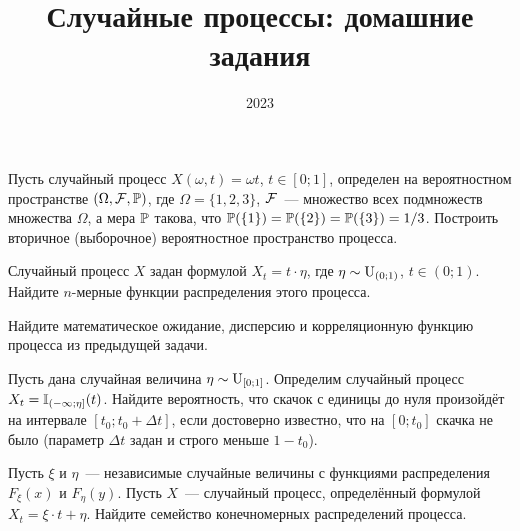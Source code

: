 \documentclass[12pt]{article}
\title{Случайные процессы: домашние задания}
\author{}
\date{2023}
\def\canon{\textbf{(каноническое задание)}}
\begin{document}

\maketitle

\newpage




\begin{exercise}[subtitle={\canon}]
    Пусть случайный процесс $ X(\omega, t) = \omega t $, $ t \in [0; 1] $,
    определен на вероятностном пространстве $ (\Omega, \mathcal{F}, \mathbb{P}) $,
    где $ \Omega = \{1, 2, 3\} $, $ \mathcal{F} $~--- множество всех подмножеств множества $ \Omega $,
    а мера $ \mathbb{P} $ такова, что $ \mathbb{P}(\{1\}) = \mathbb{P}(\{2\}) = \mathbb{P}(\{3\}) = 1/3 $.
    Построить вторичное (выборочное) вероятностное пространство процесса.
\end{exercise}


\begin{exercise}
    Случайный процесс $ X $ задан формулой $ X_t = t \cdot \eta $, где $ \eta \sim \textnormal{U}_{(0; 1)} $, $ t \in (0; 1) $.
    Найдите $ n $-мерные функции распределения этого процесса.
\end{exercise}


\begin{exercise}
    Найдите математическое ожидание, дисперсию и корреляционную функцию процесса из предыдущей задачи.
\end{exercise}


\begin{exercise}
    Пусть дана случайная величина $ \eta \sim \textnormal{U}_{[0;1]} $.
    Определим случайный процесс $ X_t = \mathbb{I}_{(-\infty; \eta]}(t) $.
    Найдите вероятность, что скачок с единицы до нуля произойдёт на интервале $ [t_0; t_0 + \Delta t] $,
    если достоверно известно, что на $ [0; t_0] $ скачка не было
    (параметр $ \Delta t $ задан и строго меньше $ 1 - t_0 $).
\end{exercise}


\begin{exercise}
    Пусть $ \xi $ и $ \eta $~--- независимые случайные величины с функциями распределения $ F_\xi(x) $ и $ F_\eta(y) $.
    Пусть $ X $~--- случайный процесс, определённый формулой $ X_t = \xi \cdot t + \eta $.
    Найдите семейство конечномерных распределений процесса.
\end{exercise}
\end{document}
